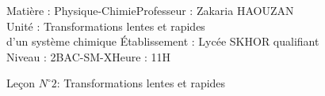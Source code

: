 \documentclass[12pt]{article}
\author{Zakaria HAOUZAN}
\date{\today}
\newcommand\headerMe[2]{\noindent{}#1\hfill#2}
\begin{document}
\headerMe{Matière : Physique-Chimie}{Professeur : Zakaria HAOUZAN}\\
\headerMe{Unité : Transformations lentes et rapides\\ d'un système chimique }{Établissement : Lycée SKHOR qualifiant}\\
\headerMe{Niveau : 2BAC-SM-X}{Heure : 11H}\\

\begin{center}

    \Large{Leçon $N^{\circ} 2 $: \color{red} Transformations lentes et rapides }
\end{center}



\end{document}
